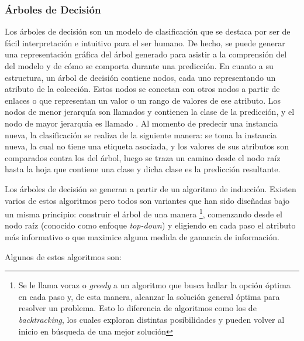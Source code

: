 \subsubsection{Árboles de Decisión}

Los árboles de decisión son un modelo de clasificación que se destaca por ser de
fácil interpretación e intuitivo para el ser humano. De hecho, se puede generar
una representación gráfica del árbol generado para asistir a la comprensión del
del modelo y de cómo se comporta durante una predicción. En cuanto a su
estructura, un árbol de decisión contiene nodos, cada uno representando un
atributo de la colección. Estos nodos se conectan con otros nodos a partir de
enlaces o  que representan un valor o un rango de valores de ese
atributo. Los nodos de menor jerarquía son llamados  y contienen
la clase de la predicción, y el nodo de mayor jerarquía es llamado
. Al momento de predecir una instancia nueva, la clasificación se
realiza de la siguiente manera:  se toma la instancia nueva, la cual no tiene
una etiqueta asociada, y los valores de sus atributos son comparados contra los
del árbol, luego se traza un camino desde el nodo raíz hasta la hoja que
contiene una clase y dicha clase es la predicción resultante. 

Los árboles de decisión se generan a partir de un algoritmo de inducción.
Existen varios de estos algoritmos pero todos son variantes que han sido
diseñadas bajo un misma principio: construir  el árbol de una manera
 \footnote{Se le llama voraz o \textit{greedy} a un algoritmo
   que busca hallar la opción óptima en cada paso y, de esta manera, alcanzar la
solución general óptima para resolver un problema.  Esto lo diferencia de
algoritmos como los de \textit{backtracking}, los cuales exploran distintas
posibilidades y pueden volver al inicio en búsqueda de una mejor solución},
comenzando desde el nodo raíz (conocido como enfoque \textit{top-down}) y
eligiendo en cada paso el atributo más informativo o que maximice alguna medida
de ganancia de información. 

Algunos de estos algoritmos son:

